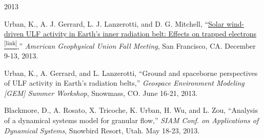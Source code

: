 \documentclass[10pt]{article}
\begin{document}
\begin{center} \Large{2013} \end{center}
\normalsize
\begin{itemize*}
  \item
    Urban, K., A. J. Gerrard, L. J. Lanzerotti, and D. G. Mitchell,
    ``\href{http://adsabs.harvard.edu/abs/2013AGUFMSM33A2129U}{Solar
    wind-driven ULF activity in Earth’s inner radiation belt:
    Effects on trapped electrons \textsuperscript{\tiny{[link]}}},'' {\em American Geophysical Union Fall
    Meeting}, San Francisco, CA. December 9-13, 2013.

  \item Urban, K., A. Gerrard, and L. Lanzerotti, ``Ground and
    spaceborne perspectives of ULF activity in Earth's radiation
    belts,'' {\em Geospace Environment Modeling [GEM] Summer Workshop},
    Snowmass, CO. June 16-21, 2013.

  \item
    Blackmore, D., A. Rosato, X. Tricoche, K. Urban, H. Wu, and L. Zou,
    ``Analysis of a dynamical systems model for granular flow,''  {\em SIAM
    Conf. on Applications of Dynamical Systems}, Snowbird Resort, Utah.
    May 18-23, 2013.


\end{itemize*}
\end{document}
